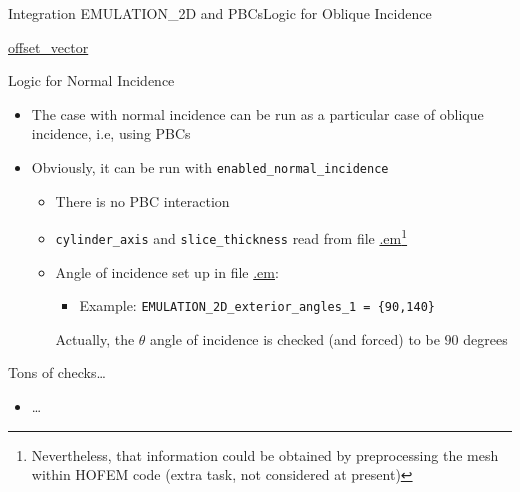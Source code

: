 \begin{frame}{Integration EMULATION\_2D and
    PBCs}{Logic for Oblique Incidence}
\begin{block}{\url{offset_vector}}
\begin{itemize}
    \end{itemize}
    
  \end{block}


  \framebreak %

  \begin{block}{Logic for Normal Incidence}
    \begin{itemize}

    \item The case with normal incidence can be run as a particular
      case of oblique incidence, i.e, using PBCs

    \item Obviously, it can be run with \verb|enabled_normal_incidence| 
      \begin{itemize}
      \item There is no PBC interaction
        
      \item \verb|cylinder_axis| and \verb|slice_thickness| read from
        file \url{.em}\footnote{Nevertheless, that information could be
          obtained by preprocessing the mesh within HOFEM code (extra
          task, not considered at present)}
      \item Angle of incidence set up in file \url{.em}:
        \begin{itemize}
        \item Example: \verb|EMULATION_2D_exterior_angles_1 = {90,140}|
        \end{itemize}
        Actually, the $\theta$ angle of incidence is checked (and forced) to be $90$ degrees
      \end{itemize}
    \end{itemize}
    
  \end{block}
 
\framebreak %

  
  \begin{block}{Tons of checks\ldots}
    \begin{itemize}
      \item \ldots
    \end{itemize}
    
  \end{block}
  

  
\end{frame}


